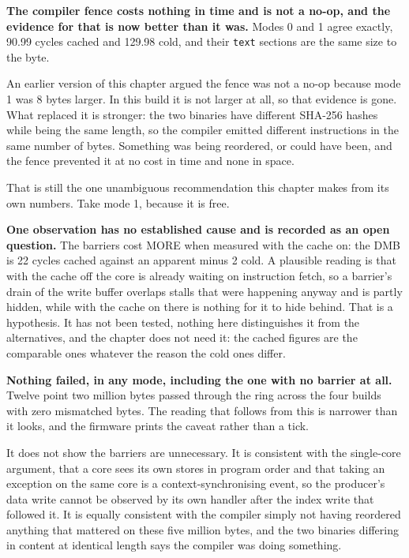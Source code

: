 \textbf{The compiler fence costs nothing in time and is not a no-op, and the
evidence for that is now better than it was.} Modes 0 and 1 agree exactly, 90.99
cycles cached and 129.98 cold, and their \texttt{text} sections are the same size
to the byte.

An earlier version of this chapter argued the fence was not a no-op because mode 1
was 8 bytes larger. In this build it is not larger at all, so that evidence is
gone. What replaced it is stronger: the two binaries have different SHA-256 hashes
while being the same length, so the compiler emitted different instructions in the
same number of bytes. Something was being reordered, or could have been, and the
fence prevented it at no cost in time and none in space.

That is still the one unambiguous recommendation this chapter makes from its own
numbers. Take mode 1, because it is free.

\textbf{One observation has no established cause and is recorded as an open
question.} The barriers cost MORE when measured with the cache on: the DMB is 22
cycles cached against an apparent minus 2 cold. A plausible reading is that with
the cache off the core is already waiting on instruction fetch, so a barrier's
drain of the write buffer overlaps stalls that were happening anyway and is partly
hidden, while with the cache on there is nothing for it to hide behind. That is a
hypothesis. It has not been tested, nothing here distinguishes it from the
alternatives, and the chapter does not need it: the cached figures are the
comparable ones whatever the reason the cold ones differ.


\textbf{Nothing failed, in any mode, including the one with no barrier at all.}
Twelve point two million bytes passed through the ring across the four builds with
zero mismatched bytes. The reading that follows from this is narrower than it
looks, and the firmware prints the caveat rather than a tick.

It does not show the barriers are unnecessary. It is consistent with the
single-core argument, that a core sees its own stores in program order and that
taking an exception on the same core is a context-synchronising event, so the
producer's data write cannot be observed by its own handler after the index write
that followed it. It is equally consistent with the compiler simply not having
reordered anything that mattered on these five million bytes, and the two binaries
differing in content at identical length says the compiler was doing something.

